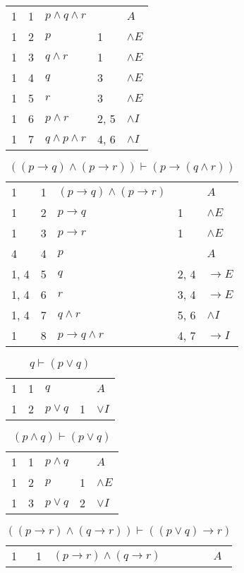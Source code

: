 \documentclass{article}
\begin{document}
\begin{table}[htbp]
\begin{tabular}{lrlll}
{1} & 1 & $p∧q∧r$ & {} & $A$ \\
{1} & 2 & $p$ & {1} & $∧E$ \\
{1} & 3 & $q∧r$ & {1} & $∧E$ \\
{1} & 4 & $q$ & {3} & $∧E$ \\
{1} & 5 & $r$ & {3} & $∧E$ \\
{1} & 6 & $p∧r$ & {2, 5} & $∧I$ \\
{1} & 7 & $q∧p∧r$ & {4, 6} & $∧I$ \\
\end{tabular}
\end{table}\begin{table}[htbp]\caption*{$((p→q)∧(p→r)) ⊢ (p→(q∧r))$}\centering\begin{tabular}{lrlll}
{1} & 1 & $(p→q)∧(p→r)$ & {} & $A$ \\
{1} & 2 & $p→q$ & {1} & $∧E$ \\
{1} & 3 & $p→r$ & {1} & $∧E$ \\
{4} & 4 & $p$ & {} & $A$ \\
{1, 4} & 5 & $q$ & {2, 4} & $→E$ \\
{1, 4} & 6 & $r$ & {3, 4} & $→E$ \\
{1, 4} & 7 & $q∧r$ & {5, 6} & $∧I$ \\
{1} & 8 & $p→q∧r$ & {4, 7} & $→I$ \\
\end{tabular}
\end{table}\begin{table}[htbp]\caption*{$q ⊢ (p∨q)$}\centering\begin{tabular}{lrlll}
{1} & 1 & $q$ & {} & $A$ \\
{1} & 2 & $p∨q$ & {1} & $∨I$ \\
\end{tabular}
\end{table}\begin{table}[htbp]\caption*{$(p∧q) ⊢ (p∨q)$}\centering\begin{tabular}{lrlll}
{1} & 1 & $p∧q$ & {} & $A$ \\
{1} & 2 & $p$ & {1} & $∧E$ \\
{1} & 3 & $p∨q$ & {2} & $∨I$ \\
\end{tabular}
\end{table}\begin{table}[htbp]\caption*{$((p→r)∧(q→r)) ⊢ ((p∨q)→r)$}\centering\begin{tabular}{lrlll}
{1} & 1 & $(p→r)∧(q→r)$ & {} & $A$ \\

\end{tabular}
\end{table}
\end{document}
